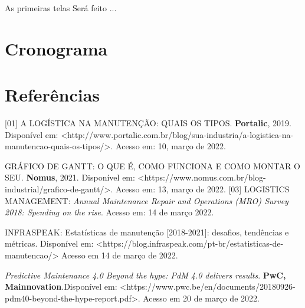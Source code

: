 \documentclass[%
  a4paper,%
  12pt,%
  english,%
  brazilian,%
]{article}
\begin{document}
As primeiras telas 
Será feito ...


\section{Cronograma}%


\section{Referências}%
[01] A LOGÍSTICA NA MANUTENÇÃO: QUAIS OS TIPOS. \textbf{Portalic}, 2019. Disponível em: <http://www.portalic.com.br/blog/sua-industria/a-logistica-na-manutencao-quais-os-tipos/>. Acesso em: 10, março de 2022.\par
[02] GRÁFICO DE GANTT: O QUE É, COMO FUNCIONA E COMO MONTAR O SEU. \textbf{Nomus}, 2021. Disponível em: <https://www.nomus.com.br/blog-industrial/grafico-de-gantt/>. Acesso em: 13, março de 2022.
[03] LOGISTICS MANAGEMENT: \textit{Annual Maintenance Repair and Operations (MRO) Survey 2018: Spending on the rise}. Acesso em: 14 de março 2022.\par
[04] INFRASPEAK: Estatísticas de manutenção [2018-2021]: desafios, tendências e métricas. Disponível em: <https://blog.infraspeak.com/pt-br/estatisticas-de-manutencao/> Acesso em 14 de março de 2022.\par
[05]\textit{Predictive Maintenance 4.0 Beyond the hype: PdM 4.0 delivers results}. \textbf{PwC, Mainnovation}.Disponível em: <https://www.pwc.be/en/documents/20180926-pdm40-beyond-the-hype-report.pdf>. Acesso em 20 de março de 2022.

\end{document}
